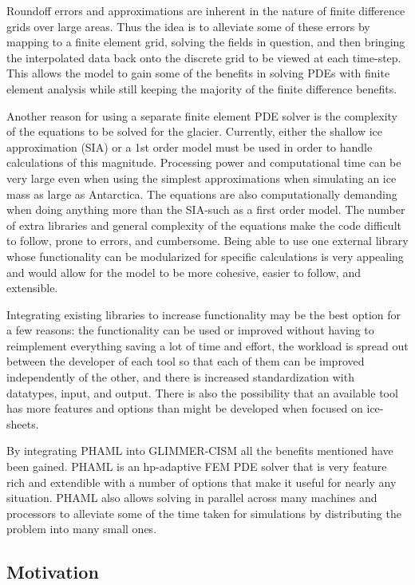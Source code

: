 Roundoff errors and approximations are inherent in the nature of finite difference grids over large areas.  Thus the idea is to alleviate some of these errors by mapping to a finite element grid, solving the fields in question, and then bringing the interpolated data back onto the discrete grid to be viewed at each time-step.  This allows the model to gain some of the benefits in solving PDEs with finite element analysis while still keeping the majority of the finite difference benefits.

Another reason for using a separate finite element PDE solver is the complexity of the equations to be solved for the glacier.  Currently, either the shallow ice approximation (SIA) or a 1st order model must be used in order to handle calculations of this magnitude.  Processing power and computational time can be very large even when using the simplest approximations when simulating an ice mass as large as Antarctica.  The equations are also computationally demanding when doing anything more than the SIA-such as a first order model.  The number of extra libraries and general complexity of the equations make the code difficult to follow, prone to errors, and cumbersome.  Being able to use one external library whose functionality can be modularized for specific calculations is very appealing and would allow for the model to be more cohesive, easier to follow, and extensible. 


Integrating existing libraries to increase functionality may be the best option for a few reasons: the functionality can be used or improved without having to reimplement everything saving a lot of time and effort, the workload is spread out between the developer of each tool so that each of them can be improved independently of the other, and there is increased standardization with datatypes, input, and output.  There is also the possibility that an available tool has more features and options than might be developed when focused on ice-sheets.

By integrating PHAML into GLIMMER-CISM all the benefits mentioned have been gained.  PHAML is an hp-adaptive FEM PDE solver that is very feature rich and extendible with a number of options that make it useful for nearly any situation.  PHAML also allows solving in parallel across many machines and processors to alleviate some of the time taken for simulations by distributing the problem into many small ones.


\subsection{Motivation}\label{sec:chp1motivation}

